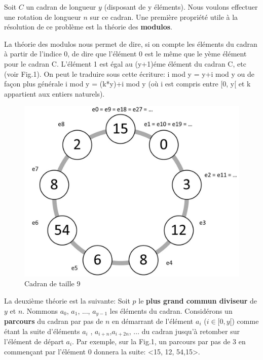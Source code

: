 \documentclass[a4paper, 12pt]{article}
\begin{document}
Soit $C$ un cadran de longueur $y$ (disposant de y éléments). Nous voulons effectuer une rotation de  longueur $n$ sur ce cadran. Une première propriété utile à la résolution de ce problème est la théorie des \textbf{modulos}. \newline

La théorie des modulos nous permet de dire, si on compte les éléments du cadran à partir de l'indice 0, de dire que l'élément 0 est le même que le yème élément pour le cadran C. L'élément 1 est égal au (y+1)éme élément du cadran C, etc (voir Fig.1). On peut le traduire sous cette écriture:\newline
i mod y = y+i mod y ou de façon plus générale \newline
i mod y = (k*y)+i mod y (où i est compris entre [0, y[ et k appartient aux entiers naturels). \newline

\begin{figure}[c|h]
	\includegraphics[scale=0.3]{cadran.jpg}
	\caption{Cadran de taille 9}
\end{figure}

La deuxième théorie est la suivante:\newline
Soit $p$ le \textbf{plus grand commun diviseur} de $y$ et $n$. Nommons $a_{0}$, $a_{1}$, ..., $a_{y-1}$ les éléments du cadran. Considérons un \textbf{parcours} du cadran par pas de $n$ en démarrant de l'élément $a_{i}$ ($i \in [0,y[$) comme étant la suite d'éléments $a_{i}$ , $a_{i+n}$,$a_{i+2n}$, ... du cadran jusqu'à retomber sur l'élément de départ $a_{i}$. Par exemple, sur la Fig.1, un parcours par pas de 3 en commençant par l'élément 0 donnera la suite: <15, 12, 54,15>.\newline
\end{document}
